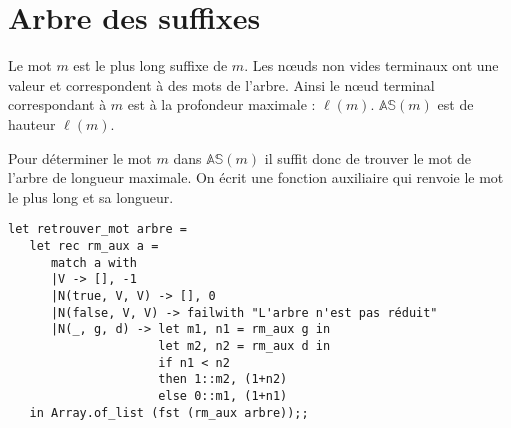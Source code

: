\section{Arbre des suffixes}
\begin{Exercise}
\begin{center}
\end{center}
\end{Exercise} 
\begin{Exercise}
Le mot $m$ est le plus long suffixe de $m$. Les nœuds non vides terminaux ont une valeur  et correspondent à des mots de l'arbre. Ainsi le nœud terminal correspondant à $m$ est à la profondeur maximale : $\ell(m)$. $\mathbb{AS}(m)$ est de hauteur $\ell(m)$.

\medskip
Pour déterminer le mot $m$ dans $\mathbb{AS}(m)$ il suffit donc de trouver le mot de l'arbre de longueur maximale. On écrit une fonction auxiliaire qui renvoie le mot le plus long et sa longueur.
\begin{lstlisting}
let retrouver_mot arbre =
   let rec rm_aux a =
      match a with
      |V -> [], -1
      |N(true, V, V) -> [], 0
      |N(false, V, V) -> failwith "L'arbre n'est pas réduit"
      |N(_, g, d) -> let m1, n1 = rm_aux g in
                     let m2, n2 = rm_aux d in
                     if n1 < n2 
                     then 1::m2, (1+n2)
                     else 0::m1, (1+n1)
   in Array.of_list (fst (rm_aux arbre));;   
\end{lstlisting}
\end{Exercise} 
